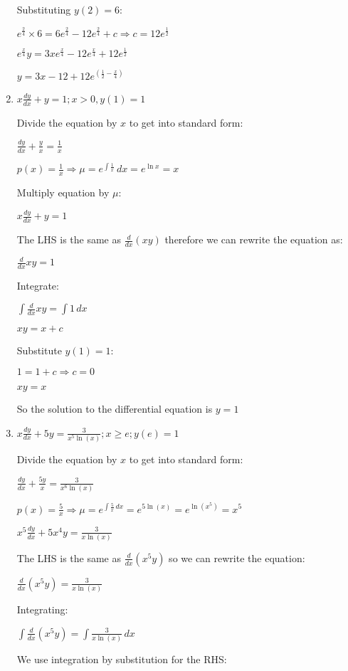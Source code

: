 \documentclass[../main.tex]{subfiles}
\begin{document}
\begin{enumerate}[itemsep=0.7cm]
    Substituting $y(2)=6$:

    $e^{\frac{2}{4}}\times 6=6e^{\frac{2}{4}}-12e^{\frac{2}{4}}+c \Rightarrow c=12e^{\frac{1}{2}}$

    $e^{\frac{x}{4}}y=3xe^{\frac{x}{4}}-12e^{\frac{x}{4}}+12e^{\frac{1}{2}}$

    $y=3x-12+12e^{(\frac{1}{2}-\frac{x}{4})}$

    \item 
    $x\frac{dy}{dx}+y=1; x>0, y(1)=1$

    Divide the equation by $x$ to get into standard form:

    $\frac{dy}{dx}+\frac{y}{x}=\frac{1}{x}$

    $p(x)=\frac{1}{x} \Rightarrow \mu=e^{\int \frac{1}{x}}\,dx=e^{\ln{x}}=x$

    Multiply equation by $\mu$:

    $x\frac{dy}{dx}+y=1$

    The LHS is the same as $\frac{d}{dx}(xy)$ therefore we can rewrite the equation as:

    $\frac{d}{dx}xy=1$

    Integrate:

    $\int \frac{d}{dx}xy=\int 1\,dx$

    $xy=x+c$

    Substitute $y(1)=1$:

    $1=1+c \Rightarrow c=0$

    $xy=x$

    So the solution to the differential equation is $y=1$

    \item 
    $x\frac{dy}{dx}+5y=\frac{3}{x^5 \ln{(x)}}; x\geq e; y(e)=1$

    Divide the equation by $x$ to get into standard form:

    $\frac{dy}{dx}+\frac{5y}{x}=\frac{3}{x^6\ln{(x)}}$

    $p(x)=\frac{5}{x} \Rightarrow \mu=e^{\int \frac{5}{x}\,dx}=e^{5\ln{(x)}}=e^{\ln{(x^5)}}=x^5$

    $x^5\frac{dy}{dx}+5x^4y=\frac{3}{x\ln{(x)}}$

    The LHS is the same as $\frac{d}{dx}(x^5y)$ so we can rewrite the equation:

    $\frac{d}{dx}(x^5y)=\frac{3}{x\ln{(x)}}$

    Integrating:

    $\int \frac{d}{dx}(x^5y)=\int \frac{3}{x\ln{(x)}}\,dx$

    We use integration by substitution for the RHS:


\end{enumerate}
\end{document}
